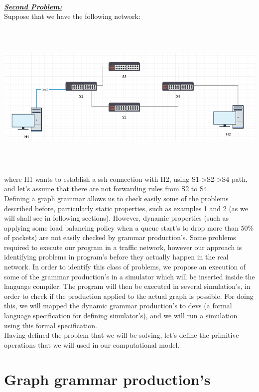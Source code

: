 \documentclass[envcountsect,runningheads]{llncs}
\begin{document}
\\
\textbf{\underline{\textit{Second Problem:}}} \\
Suppose that we have the following network:\\
\includegraphics[width=\textwidth, height=8cm]{second_example.png}\\
where H1 wants to establish a ssh connection with H2, using S1->S2->S4 path, and 
let's assume that there are not forwarding rules from S2 to S4. 
\\

Defining a graph grammar allows us to check easily some of the problems described 
before, particularly static properties, such as examples 1 and 2 (as we will shall see in following
sections). However, dynamic properties (such as applying some load balancing policy when a 
queue start's to drop more than 50\% of packets) are not easily checked by grammar 
production's. Some problems required to execute our program in a traffic network, 
however our approach is identifying problems in program's before they actually 
happen in the real network. In order to identify this class of problems, we 
propose an execution of some of the grammar production's in a simulator which 
will be inserted inside the language compiler. The program will then be executed 
in several simulation's, in order to check if the production applied to the actual graph is 
possible. For doing this, we will mapped the dynamic grammar production's to 
devs (a formal language specification for defining simulator's), and we will run a simulation 
using this formal specification.\\
Having defined the problem that we will be solving, let's define the primitive 
operations that we will used in our computational model.

\section{Graph grammar production's}
\end{document}
